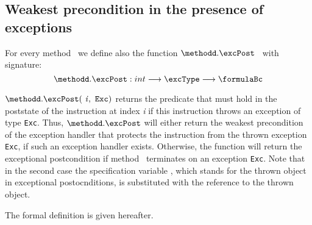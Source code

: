 \subsection{Weakest precondition in the presence of exceptions}\label{wpExc} 

For every method \methodd \  we define also the function $ \methodd.\excPost $ \ with signature:
$$\methodd.\excPost : int   \longrightarrow \excType \longrightarrow  \formulaBc  $$
 
$ \methodd.\excPost(\mbox{ \rm \textit{i}},  \mbox{ \rm \texttt{Exc}})$ 
returns the predicate that must hold in the poststate of the instruction at index \textit{i} if this instruction throws an exception of
type \texttt{Exc}.
Thus, $\methodd.\excPost$ will either return the weakest precondition of the exception handler that protects the instruction from the thrown exception \texttt{Exc},
if such an exception handler exists. Otherwise, the function will return the exceptional postcondition if method \methodd \ terminates on
an exception  \texttt{Exc}. Note that in the second case the specification variable \EXC, which stands for the thrown object in exceptional postocnditions, is substituted with the reference to the thrown object.

The formal definition is given hereafter.

